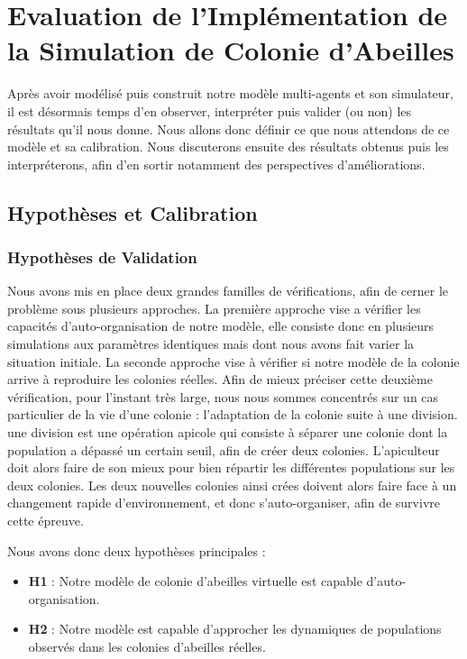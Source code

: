 \chapter{Evaluation de l'Implémentation de la Simulation de Colonie d'Abeilles}
\label{ChapitreEvalSMA}
	Après avoir modélisé puis construit notre modèle multi-agents et son simulateur, il est désormais temps d'en observer, interpréter puis valider (ou non) les résultats qu'il nous donne. Nous allons donc définir ce que nous attendons de ce modèle et sa calibration. Nous discuterons ensuite des résultats obtenus puis les interpréterons, afin d'en sortir notamment des perspectives d'améliorations.
	\section{Hypothèses et Calibration}
		\subsection{Hypothèses de Validation}
			Nous avons mis en place deux grandes familles de vérifications, afin de cerner le problème sous plusieurs approches. La première approche vise a vérifier les capacités d'auto-organisation de notre modèle, elle consiste donc en plusieurs simulations aux paramètres identiques mais dont nous avons fait varier la situation initiale. La seconde approche vise à vérifier si notre modèle de la colonie arrive à reproduire les colonies réelles. Afin de mieux préciser cette deuxième vérification, pour l'instant très large, nous nous sommes concentrés sur un cas particulier de la vie d'une colonie : l'adaptation de la colonie suite à une division. une division est une opération apicole qui consiste à séparer une colonie dont la population a dépassé un certain seuil, afin de créer deux colonies. L'apiculteur doit alors faire de son mieux pour bien répartir les différentes populations sur les deux colonies. Les deux nouvelles colonies ainsi crées doivent alors faire face à un changement rapide d'environnement, et donc s'auto-organiser, afin de survivre cette épreuve.
			
			Nous avons donc deux hypothèses principales :
			\begin{itemize}
				\item \textbf{H1} : Notre modèle de colonie d'abeilles virtuelle est capable d'auto-organisation.
				\item \textbf{H2} : Notre modèle est capable d'approcher les dynamiques de populations observés dans les colonies d'abeilles réelles.
			\end{itemize}
			
